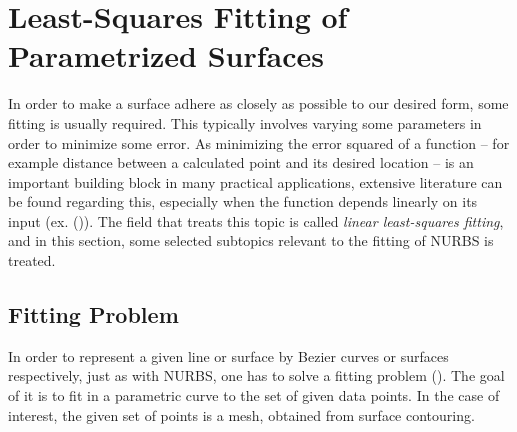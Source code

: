 \section{Least-Squares Fitting of Parametrized Surfaces}
\label{sec:LSQfitting}
In order to make a surface adhere as closely as possible to our desired form, some fitting is usually required. This typically involves varying some parameters in order to minimize some error. As minimizing the error squared of a function -- for example distance between a calculated point and its desired location -- is an important building block in many practical applications, extensive literature can be found regarding this, especially when the function depends linearly on its input (ex. (\cite{becker2011advanced})). The field that treats this topic is called \emph{linear least-squares fitting}, and in this section, some selected subtopics relevant to the fitting of \acs{NURBS} is treated.


\subsection{Fitting Problem}
In order to represent a given line or surface by Bezier curves or surfaces respectively, just as with NURBS, one has to solve a fitting problem (\cite{becker2011advanced}). The goal of it is to fit in a parametric curve to the set of given data points. In the case of interest, the given set of points is a mesh, obtained from surface contouring.

